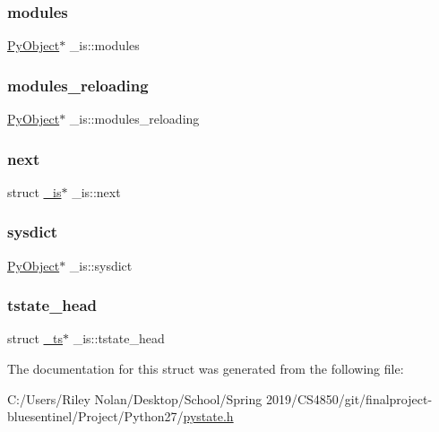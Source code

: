 \mbox{\label{struct__is_a7f06027c7ab7541936413d7d91eac5fb}} 
\subsubsection{\texorpdfstring{modules}{modules}}
{\footnotesize\ttfamily \mbox{\hyperlink{_python27_2object_8h_aadc84ac7aed2cfa6f20c25f62bf3dac7}{Py\+Object}}$\ast$ \+\_\+is\+::modules}

\mbox{\label{struct__is_a6a0f493b1eaa633105739d733a04412e}} 
\subsubsection{\texorpdfstring{modules\_reloading}{modules\_reloading}}
{\footnotesize\ttfamily \mbox{\hyperlink{_python27_2object_8h_aadc84ac7aed2cfa6f20c25f62bf3dac7}{Py\+Object}}$\ast$ \+\_\+is\+::modules\+\_\+reloading}

\mbox{\label{struct__is_a1c3d238e47f3b06f3dcc161e18145e4a}} 
\subsubsection{\texorpdfstring{next}{next}}
{\footnotesize\ttfamily struct \mbox{\hyperlink{struct__is}{\+\_\+is}}$\ast$ \+\_\+is\+::next}

\mbox{\label{struct__is_a95556056d8c72409c77f50896b610110}} 
\subsubsection{\texorpdfstring{sysdict}{sysdict}}
{\footnotesize\ttfamily \mbox{\hyperlink{_python27_2object_8h_aadc84ac7aed2cfa6f20c25f62bf3dac7}{Py\+Object}}$\ast$ \+\_\+is\+::sysdict}

\mbox{\label{struct__is_a0691d58c38c8286ac6dbceb6aa98bd09}} 
\subsubsection{\texorpdfstring{tstate\_head}{tstate\_head}}
{\footnotesize\ttfamily struct \mbox{\hyperlink{struct__ts}{\+\_\+ts}}$\ast$ \+\_\+is\+::tstate\+\_\+head}



The documentation for this struct was generated from the following file\+:\begin{DoxyCompactItemize}
\item 
C\+:/\+Users/\+Riley Nolan/\+Desktop/\+School/\+Spring 2019/\+C\+S4850/git/finalproject-\/bluesentinel/\+Project/\+Python27/\mbox{\hyperlink{pystate_8h}{pystate.\+h}}\end{DoxyCompactItemize}
